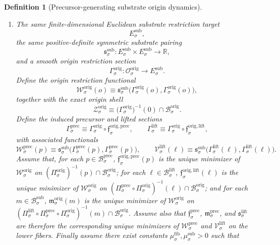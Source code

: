 \documentclass[11pt]{article}
\newcommand{\SubBody}[1]{\mathcal B_{#1}^{\mathrm{sub}}}
\newcommand{\SubTarget}[1]{E_{#1}^{\mathrm{sub}}}
\newcommand{\SubPair}[1]{\mathfrak s_{#1}^{\mathrm{sub}}}
\newcommand{\LiftBody}[1]{\mathcal B_{#1}^{\mathrm{lift}}}
\newcommand{\LiftProj}[1]{\Pi_{#1}^{\mathrm{lift}}}
\newcommand{\LiftSelect}[1]{\mathfrak s_{#1}^{\mathrm{lift}}}
\newcommand{\LiftSection}[1]{\Gamma_{#1}^{\mathrm{lift}}}
\newcommand{\LiftFunctional}[1]{\mathscr V_{#1}^{\mathrm{lift}}}
\newcommand{\PrecBody}[1]{\mathcal B_{#1}^{\mathrm{prec}}}
\newcommand{\PrecProj}[1]{\Pi_{#1}^{\mathrm{prec}}}
\newcommand{\PrecLiftMin}[1]{\mathfrak f_{#1}^{\mathrm{prec}}}
\newcommand{\PrecSubMin}[1]{\mathfrak m_{#1}^{\mathrm{prec}}}
\newcommand{\PrecSection}[1]{\Gamma_{#1}^{\mathrm{prec}}}
\newcommand{\PrecFunctional}[1]{\mathscr W_{#1}^{\mathrm{prec}}}
\newcommand{\OrigSpace}[1]{\mathcal O_{#1}^{\mathrm{orig}}}
\newcommand{\OrigBody}[1]{\mathcal B_{#1}^{\mathrm{orig}}}
\newcommand{\OrigProj}[1]{\Pi_{#1}^{\mathrm{orig}}}
\newcommand{\OrigPrecMin}[1]{\mathfrak f_{#1}^{\mathrm{orig,prec}}}
\newcommand{\OrigLiftMin}[1]{\mathfrak f_{#1}^{\mathrm{orig,lift}}}
\newcommand{\OrigSubMin}[1]{\mathfrak m_{#1}^{\mathrm{orig}}}
\newcommand{\OrigSection}[1]{\Gamma_{#1}^{\mathrm{orig}}}
\newcommand{\OrigFunctional}[1]{\mathscr W_{#1}^{\mathrm{orig}}}
\newcommand{\OrigShellSet}[1]{\mathcal Z_{#1}^{\mathrm{orig}}}
\newtheorem{definition}{Definition}
\begin{document}
\begin{definition}[Precursor-generating substrate origin dynamics]
\begin{enumerate}
    \item The same finite-dimensional Euclidean substrate restriction target
    \[
    \SubTarget{\sigma},
    \]
    the same positive-definite symmetric substrate pairing
    \[
    \SubPair{\sigma}:
    \SubTarget{\sigma}\times\SubTarget{\sigma}\to\mathbb R,
    \]
    and a smooth origin restriction section
    \[
    \OrigSection{\sigma}:\OrigSpace{\sigma}\to\SubTarget{\sigma}.
    \]
    Define the origin restriction functional
    \begin{equation}
    \OrigFunctional{\sigma}(o)
    \equiv
    \SubPair{\sigma}\bigl(\OrigSection{\sigma}(o),\OrigSection{\sigma}(o)\bigr),
    \label{eq:origfunctional}
    \end{equation}
    together with the exact origin shell
    \begin{equation}
    \OrigShellSet{\sigma}
    \equiv
    \bigl(\OrigSection{\sigma}\bigr)^{-1}(0)\cap\OrigBody{\sigma}.
    \label{eq:origshell}
    \end{equation}
    Define the induced precursor and lifted sections
    \begin{equation}
    \PrecSection{\sigma}
    \equiv
    \OrigSection{\sigma}\circ\OrigPrecMin{\sigma},
    \qquad
    \LiftSection{\sigma}
    \equiv
    \OrigSection{\sigma}\circ\OrigLiftMin{\sigma},
    \label{eq:originducedsections}
    \end{equation}
    with associated functionals
    \begin{equation}
    \PrecFunctional{\sigma}(p)
    \equiv
    \SubPair{\sigma}\bigl(\PrecSection{\sigma}(p),\PrecSection{\sigma}(p)\bigr),
    \qquad
    \LiftFunctional{\sigma}(\ell)
    \equiv
    \SubPair{\sigma}\bigl(\LiftSection{\sigma}(\ell),\LiftSection{\sigma}(\ell)\bigr).
    \label{eq:originducedfunctionals}
    \end{equation}
    Assume that, for each \(p\in\PrecBody{\sigma}\), \(\OrigPrecMin{\sigma}(p)\) is the unique minimizer of \(\OrigFunctional{\sigma}\) on \((\OrigProj{\sigma})^{-1}(p)\cap\OrigBody{\sigma}\); for each \(\ell\in\LiftBody{\sigma}\), \(\OrigLiftMin{\sigma}(\ell)\) is the unique minimizer of \(\OrigFunctional{\sigma}\) on \((\PrecProj{\sigma}\circ\OrigProj{\sigma})^{-1}(\ell)\cap\OrigBody{\sigma}\); and for each \(m\in\SubBody{\sigma}\), \(\OrigSubMin{\sigma}(m)\) is the unique minimizer of \(\OrigFunctional{\sigma}\) on \((\LiftProj{\sigma}\circ\PrecProj{\sigma}\circ\OrigProj{\sigma})^{-1}(m)\cap\OrigBody{\sigma}\). Assume also that \(\PrecLiftMin{\sigma}\), \(\PrecSubMin{\sigma}\), and \(\LiftSelect{\sigma}\) are therefore the corresponding unique minimizers of \(\PrecFunctional{\sigma}\) and \(\LiftFunctional{\sigma}\) on the lower fibers. Finally assume there exist constants \(\mu_{\sigma}^{\mathrm{fib}},\mu_{\sigma}^{\mathrm{sub}}>0\) such that

\end{enumerate}
\end{definition}
\end{document}
